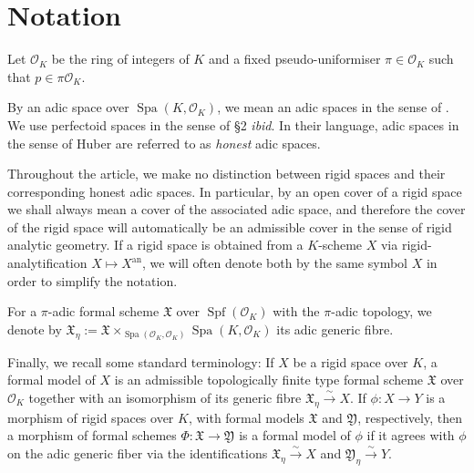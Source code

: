 \documentclass[10pt,oneside]{amsart}
\theoremstyle{definition}
\begin{document}
\section*{Notation}
	Let $\mathcal O_K$ be the ring of integers of $K$ and  a fixed pseudo-uniformiser $\pi\in \mathcal O_K$ such that $p\in\pi\mathcal O_K$.
	
	By an adic space over $\operatorname{Spa}(K,\mathcal O_K)$, we mean an adic spaces in the sense of \cite{SW}. We use perfectoid spaces in the sense of \S2 \textit{\small ibid}. In their language, adic spaces in the sense of Huber are referred to as \textit{honest} adic spaces. 
	
	Throughout the article, we make no distinction between rigid spaces and their corresponding honest adic spaces.
	In particular, by an open cover of a rigid space we shall always mean a cover of the associated adic space, and therefore the cover of the rigid space will automatically be an admissible cover in the sense of rigid analytic geometry. 
	If a rigid space is obtained from a $K$-scheme $X$ via rigid-analytification $X\mapsto X^{\operatorname{an}}$, we will often denote both by the same symbol $X$ in order to simplify the notation.
	
	For a $\pi$-adic formal scheme $\mathfrak X$ over $\operatorname{Spf}(\mathcal O_K)$ with the $\pi$-adic topology, we denote by $\mathfrak X_\eta:=\mathfrak X\times_{\operatorname{Spa}(\mathcal O_K,\mathcal O_K)}\operatorname{Spa}(K,\mathcal O_K)$ its adic generic fibre. 
	
	Finally, we recall some standard terminology: If $X$ be a rigid space over $K$, a formal model of $X$ is an admissible topologically finite type formal scheme $\mathfrak X$ over $\mathcal O_K$ together with an isomorphism of its generic fibre $\mathfrak X_\eta \xrightarrow{\sim} X$.
	If $\phi:  X\rightarrow  Y$ is a morphism of rigid spaces over $K$, with formal models $\mathfrak X$ and $\mathfrak Y$, respectively, then a morphism of formal schemes $\Phi:\mathfrak X \rightarrow \mathfrak Y$ is a formal model of $\phi$ if it agrees with $\phi$ on the adic generic fiber via the identifications $\mathfrak X_\eta \xrightarrow{\sim} X$ and $\mathfrak Y_\eta \xrightarrow{\sim} Y$.


	
\end{document}
